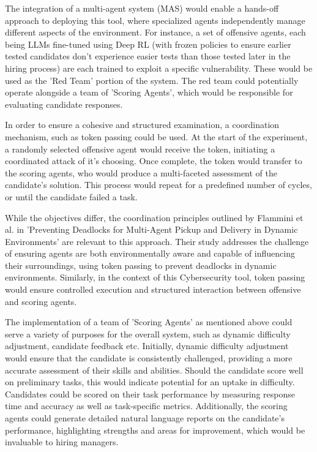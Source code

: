 \documentclass[a4paper,9pt]{scrartcl}
\begin{document}
The integration of a multi-agent system (MAS) would enable a hands-off approach to 
deploying this tool, where specialized agents independently manage different aspects 
of the environment. For instance, a set of offensive agents, each being LLMs fine-tuned 
using Deep RL (with frozen policies to ensure earlier tested candidates don't 
experience easier tests than those tested later in the hiring process) are each 
trained to exploit a specific vulnerability. These would be used as the 'Red Team' portion 
of the system. The red team could potentially operate alongside a team of 'Scoring Agents', 
which would be responsible for evaluating candidate responses. 

In order to ensure a cohesive and structured examination, a coordination mechanism, such as token passing
could be used. At the start of the experiment, a randomly selected offensive agent would receive 
the token, initiating a coordinated attack of it's choosing. Once complete, the token would transfer to the 
scoring agents, who would produce a multi-faceted assessment of the candidate’s solution. This process would repeat for 
a predefined number of cycles, or until the candidate failed a task. 

While the objectives differ, the coordination principles outlined by 
Flammini et al. in 'Preventing Deadlocks for Multi-Agent Pickup and Delivery in 
Dynamic Environments' \cite{flamminiPreventingDeadlocksMultiAgent2024} are relevant to 
this approach. Their study addresses the challenge of ensuring agents are both 
environmentally aware and capable of influencing their surroundings, using token 
passing to prevent deadlocks in dynamic environments. Similarly, in the context of this Cybersecurity 
tool, token passing would ensure controlled execution and structured interaction between 
offensive and scoring agents.

The implementation of a team of 'Scoring Agents' as mentioned above could serve a variety of
purposes for the overall system, such as dynamic difficulty adjustment, candidate 
feedback etc. Initially, dynamic difficulty adjustment would ensure that the candidate 
is consistently challenged, providing a more accurate assessment of their skills and 
abilities. Should the candidate score well on preliminary tasks, this would indicate 
potential for an uptake in difficulty. Candidates could be scored on their task performance 
by measuring response time and accuracy as well as task-specific metrics. Additionally, 
the scoring agents could generate detailed natural language reports on the candidate's 
performance, highlighting strengths and areas for improvement, which would be invaluable 
to hiring managers. 
\end{document}
